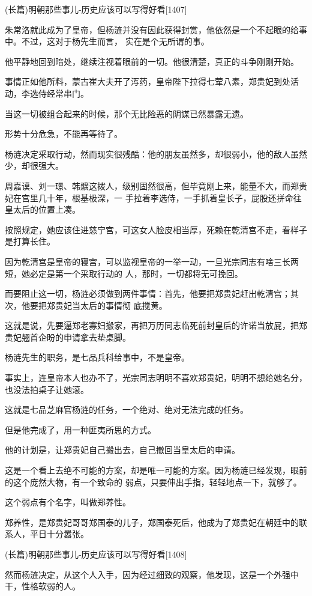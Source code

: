 \documentclass[11pt,a4paper,onecolumn]{article}
\begin{document}
(长篇)明朝那些事儿-历史应该可以写得好看$[$1407$]$

朱常洛就此成为了皇帝，但杨涟并没有因此获得封赏，他依然是一个不起眼的给事中。不过，这对于杨先生而言，
实在是个无所谓的事。

他平静地回到暗处，继续注视着眼前的一切。他很清楚，真正的斗争刚刚开始。

事情正如他所料，蒙古崔大夫开了泻药，皇帝陛下拉得七荤八素，郑贵妃到处活动，李选侍经常串门。

当这一切被组合起来的时候，那个无比险恶的阴谋已然暴露无遗。

形势十分危急，不能再等待了。

杨涟决定采取行动，然而现实很残酷：他的朋友虽然多，却很弱小，他的敌人虽然少，却很强大。

周嘉谟、刘一璟、韩爌这拨人，级别固然很高，但毕竟刚上来，能量不大，而郑贵妃在宫里几十年，根基极深，一
手拉着李选侍，一手抓着皇长子，屁股还拼命往皇太后的位置上凑。

按照规定，她应该住进慈宁宫，可这女人脸皮相当厚，死赖在乾清宫不走，看样子是打算长住。

因为乾清宫是皇帝的寝宫，可以监视皇帝的一举一动，一旦光宗同志有啥三长两短，她必定是第一个采取行动的
人，那时，一切都将无可挽回。

而要阻止这一切，杨涟必须做到两件事情：首先，他要把郑贵妃赶出乾清宫；其次，他要把郑贵妃当太后的事情彻
底搅黄。

这就是说，先要逼郑老寡妇搬家，再把万历同志临死前封皇后的许诺当放屁，把郑贵妃翘首企盼的申请拿去垫桌脚。

杨涟先生的职务，是七品兵科给事中，不是皇帝。

事实上，连皇帝本人也办不了，光宗同志明明不喜欢郑贵妃，明明不想给她名分，也没法拍桌子让她滚。

这就是七品芝麻官杨涟的任务，一个绝对、绝对无法完成的任务。

但是他完成了，用一种匪夷所思的方式。

他的计划是，让郑贵妃自己搬出去，自己撤回当皇太后的申请。

这是一个看上去绝不可能的方案，却是唯一可能的方案。因为杨涟已经发现，眼前的这个庞然大物，有一个致命的
弱点，只要伸出手指，轻轻地点一下，就够了。

这个弱点有个名字，叫做郑养性。

郑养性，是郑贵妃哥哥郑国泰的儿子，郑国泰死后，他成为了郑贵妃在朝廷中的联系人，平日十分嚣张。

(长篇)明朝那些事儿-历史应该可以写得好看$[$1408$]$

然而杨涟决定，从这个人入手，因为经过细致的观察，他发现，这是一个外强中干，性格软弱的人。
\end{document}
